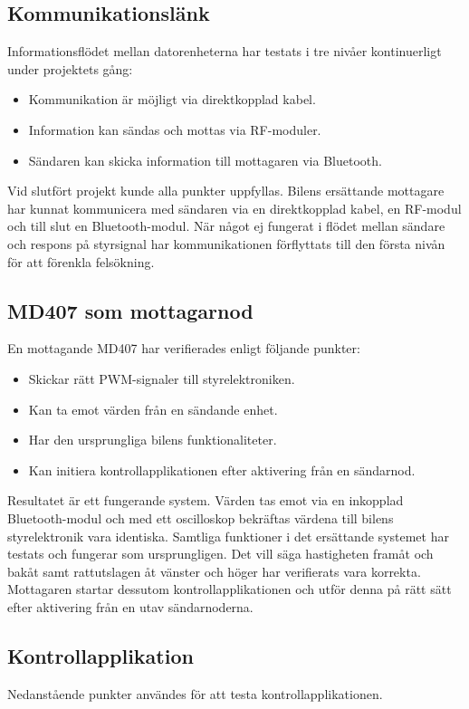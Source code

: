 \documentclass[a4paper]{article}
\begin{document}
\newpage
\subsection{Kommunikationslänk}
Informationsflödet mellan datorenheterna har testats i tre nivåer kontinuerligt under projektets gång:
\begin{itemize}
\item Kommunikation är möjligt via direktkopplad kabel.
\item Information kan sändas och mottas via RF-moduler.
\item Sändaren kan skicka information till mottagaren via Bluetooth.
\end{itemize}

\noindent
Vid slutfört projekt kunde alla punkter uppfyllas. Bilens ersättande mottagare har kunnat kommunicera med sändaren via en direktkopplad kabel, en RF-modul och till slut en Bluetooth-modul. När något ej fungerat i flödet mellan sändare och respons på styrsignal har kommunikationen förflyttats till den första nivån för att förenkla felsökning.

\subsection{MD407 som mottagarnod}
En mottagande MD407 har verifierades enligt följande punkter:

\begin{itemize}
\item Skickar rätt PWM-signaler till styrelektroniken.
\item Kan ta emot värden från en sändande enhet.
\item Har den ursprungliga bilens funktionaliteter.
\item Kan initiera kontrollapplikationen efter aktivering från en sändarnod.
\end{itemize}

\noindent
Resultatet är ett fungerande system. Värden tas emot via en inkopplad Bluetooth-modul och med ett oscilloskop bekräftas värdena till bilens styrelektronik vara identiska. Samtliga funktioner i det ersättande systemet har testats och fungerar som ursprungligen. Det vill säga hastigheten framåt och bakåt samt rattutslagen åt vänster och höger har verifierats vara korrekta. Mottagaren startar dessutom kontrollapplikationen och utför denna på rätt sätt efter aktivering från en utav sändarnoderna.




\subsection{Kontrollapplikation}
Nedanstående punkter användes för att testa kontrollapplikationen.
\end{document}
